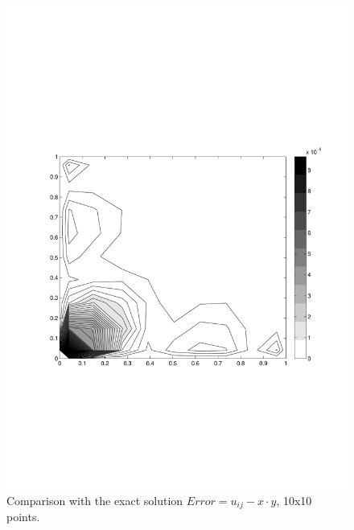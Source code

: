 \begin{multicols}{2}

\begin{figure}[H]
\centering
\includegraphics[scale=0.45, trim = 30mm 75mm 15mm 70mm, clip]{./Figures/3-BVP/error_10.pdf}
\caption{Comparison with the exact solution $Error=u_{ij}-x\cdot y$, 10x10
points.}
\end{figure}


\columnbreak


\end{multicols}

